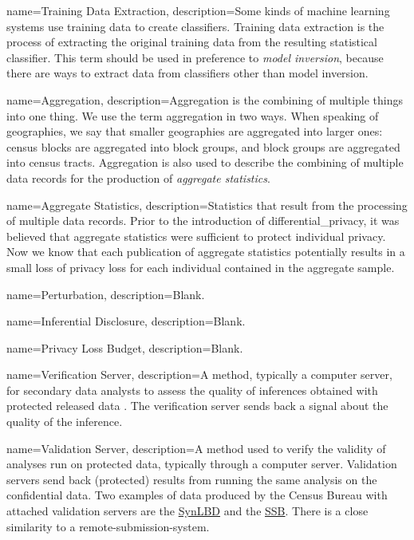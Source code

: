{
    name=Training Data Extraction,
    description={Some kinds of machine learning systems use training data to create classifiers. Training data extraction is the process of extracting the original training data from the resulting statistical classifier. This term should be used in preference to \textit{model inversion}, because there are ways to extract data from classifiers other than model inversion. }
}

{
    name=Aggregation,
    description={Aggregation is the combining of multiple things into one thing. We use the term aggregation in two ways. When speaking of geographies, we say that smaller geographies are aggregated into larger ones: census blocks are aggregated into block groups, and block groups are aggregated into census tracts. Aggregation is also used to describe the combining of multiple data \glspl{record} for the production of \emph{aggregate statistics}.
    }
}

{
    name=Aggregate Statistics,
    description={Statistics that result from the processing of multiple data \glspl{record}. Prior to the introduction of \gls{differential_privacy}, it was believed that aggregate statistics were sufficient to protect individual privacy. Now we know that each publication of aggregate statistics potentially results in a small loss of privacy loss for each individual contained in the aggregate sample.}
}

{
    name=Perturbation,
    description={Blank.
    }
}

{
    name=Inferential Disclosure,
    description={Blank.
    }
}

{
    name=Privacy Loss Budget,
    description={Blank.
    }
}

{
    name=Verification Server,
    description={A method, typically a computer server,  for secondary data analysts to assess the quality of inferences obtained with protected released data \parencite{reiter_verification_2009,barrientos_providing_2018}. The verification server sends back a signal about the quality of the inference.
    } 
}

{
    name=Validation Server,
    description={A method used to verify the validity of analyses run on protected data, typically through a computer server. Validation servers send back  (protected) results from running the same analysis on the confidential data. Two examples of data produced by the Census Bureau with attached validation servers are the \href{https://www.census.gov/programs-surveys/ces/data/public-use-data/synthetic-longitudinal-business-database/validating-results.html}{SynLBD} and the \href{https://www.census.gov/programs-surveys/sipp/guidance/sipp-synthetic-beta-data-product.html}{SSB}. There is a close similarity to a \gls{remote-submission-system}.    } 
}

